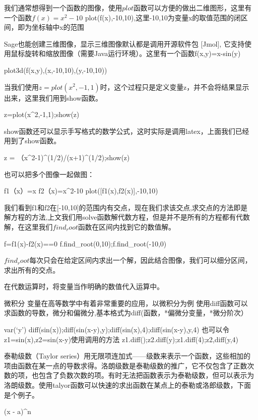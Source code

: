 \documentclass[a4paper]{article}
\begin{document}
\begin{multicols}{2}
我们通常想得到一个函数的图像，使用$plot$函数可以方便的做出二维图形，这里有一个函数$f(x)=x^2-10$
plot(f(x),-10,10),这里-10,10为变量x的取值范围的闭区间，即为坐标轴中x的范围

Sage也能创建三维图像，显示三维图像默认都是调用开源软件包 [Jmol], 它支持使用鼠标旋转和缩放图像（需要Java运行环境）。这里有一个函数f(x,y)=x-sin(y)
\begin{sagecommandline}
	plot3d(f(x,y),(x,-10,10),(y,-10,10))
\end{sagecommandline}
当我们使用$z=plot(x^2,-1,1)$时，这个过程只是定义变量z，并不会将结果显示出来，这里我们用到show函数。
\begin{sagecommandline}
	z=plot(x^2,-1,1);show(z)
\end{sagecommandline}
show函数还可以显示手写格式的数学公式，这时实际是调用latex，上面我们已经用到了show函数。
\begin{sageblock}
	z = （x^2-1)^(1/2)/(x+1)^(1/2);show(z)
\end{sageblock}

也可以把多个图像一起做图：
\begin{sagecommandline}
	f1（x）=x
	f2（x)=x^2-10
	plot([f1(x),f2(x)],-10,10)
\end{sagecommandline}
我们看到f1和f2在[-10,10]的范围内有交点，现在我们求该交点,求交点的方法即是解方程的方法,上文我们用solve函数解代数方程，但是并不是所有的方程都有代数解，在这里我们$find_root$函数在区间内找到它的数值解。
\begin{sageblock}
	f=f1(x)-f2(x)==0
	f.find_root(0,10);f.find_root(-10,0) 
\end{sageblock}
$find_root$每次只会在给定区间内求出一个解，因此结合图像，我们可以细分区间，求出所有的交点。


在代数运算时，将变量当作明确的数值代入运算中。



微积分
变量在高等数学中有着非常重要的应用，以微积分为例
使用diff函数可以求函数的导数，微分和偏微分,基本格式为diff(函数，*偏微分变量，*微分阶次）
\begin{sagecommandline}
	var(`y')
	diff(sin(x));diff(sin(x-y),y);diff(sin(x),4);diff(sin(x-y),y,4)
	也可以令z1=sin(x),z2=sin(x-y)使用调用的方法
	z1.diff();z2.diff(y);z1.diff(4);z2,diff(y,4)
\end{sagecommandline}
泰勒级数（Taylor series）用无限项连加式——级数来表示一个函数，这些相加的项由函数在某一点的导数求得。洛朗级数是泰勒级数的推广，它不仅包含了正数次数的项，也包含了负数次数的项。有时无法把函数表示为泰勒级数，但可以表示为洛朗级数。使用talyor函数可以快速的求出函数在某点上的泰勒或洛郎级数，下面是个例子。
\begin{sagecommandline}
	(x - a)^n
	

\end{sagecommandline}
\end{multicols}
\end{document}
